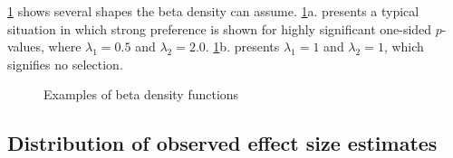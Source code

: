 \documentclass[
  american,
  man, donotrepeattitle,floatsintext]{apa7}
\begin{document}
\ref{fig:beta-functions} shows several shapes the beta density can assume. \ref{fig:beta-functions}a. presents a typical situation in which strong preference is shown for highly significant one-sided \(p\)-values, where \(\lambda_1 = 0.5\) and \(\lambda_2 = 2.0\). \ref{fig:beta-functions}b. presents \(\lambda_1 = 1\) and \(\lambda_2 = 1\), which signifies no selection.

\begin{figure}[tb]
\caption{Examples of beta density functions}\label{fig:beta-functions}
\end{figure}

\subsection{Distribution of observed effect size estimates}\label{distribution-of-observed-effect-size-estimates}
\end{document}
